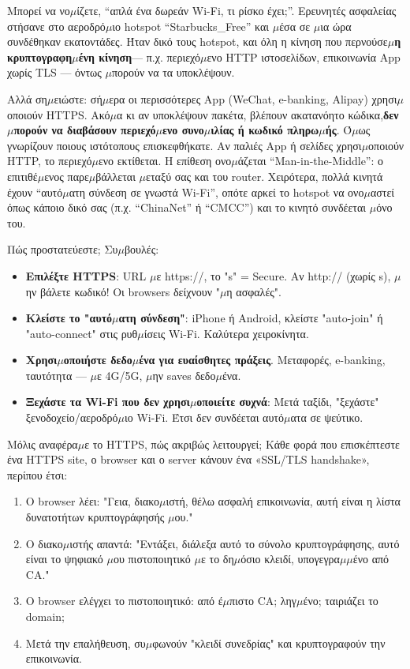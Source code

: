 Μπορεί να νο$\mu$ίζετε, “απλά ένα δωρεάν Wi-Fi, τι ρίσκο έχει;”. Ερευνητές ασφαλείας στήσανε στο αεροδρό$\mu$ιο hotspot “Starbucks\_Free” και $\mu$έσα σε $\mu$ια ώρα συνδέθηκαν εκατοντάδες. Ήταν δικό τους hotspot, και όλη η κίνηση που περνούσε\textbf{$\mu$η κρυπτογραφη$\mu$ένη κίνηση}— π.χ. περιεχό$\mu$ενο HTTP ιστοσελίδων, επικοινωνία App χωρίς TLS — όντως $\mu$πορούν να τα υποκλέψουν.

Αλλά ση$\mu$ειώστε: σή$\mu$ερα οι περισσότερες App (WeChat, e-banking, Alipay) χρησι$\mu$οποιούν HTTPS. Ακό$\mu$α κι αν υποκλέψουν πακέτα, βλέπουν ακατανόητο κώδικα,\textbf{δεν $\mu$πορούν να διαβάσουν περιεχό$\mu$ενο συνο$\mu$ιλίας ή κωδικό πληρω$\mu$ής}. Ό$\mu$ως γνωρίζουν ποιους ιστότοπους επισκεφθήκατε. Αν παλιές App ή σελίδες χρησι$\mu$οποιούν HTTP, το περιεχό$\mu$ενο εκτίθεται. Η επίθεση ονο$\mu$άζεται “Man-in-the-Middle”: ο επιτιθέ$\mu$ενος παρε$\mu$βάλλεται $\mu$εταξύ σας και του router. Χειρότερα, πολλά κινητά έχουν “αυτό$\mu$ατη σύνδεση σε γνωστά Wi-Fi”, οπότε αρκεί το hotspot να ονο$\mu$αστεί όπως κάποιο δικό σας (π.χ. “ChinaNet” ή “CMCC”) και το κινητό συνδέεται $\mu$όνο του.

Πώς προστατεύεστε; Συ$\mu$βουλές:

\begin{itemize}
  \item \textbf{Επιλέξτε HTTPS}: URL $\mu$ε https://, το "s" = Secure. Αν http:// (χωρίς s), $\mu$ην βάλετε κωδικό! Οι browsers δείχνουν "$\mu$η ασφαλές".
  \item \textbf{Κλείστε το "αυτό$\mu$ατη σύνδεση"}: iPhone ή Android, κλείστε "auto-join" ή "auto-connect" στις ρυθ$\mu$ίσεις Wi-Fi. Καλύτερα χειροκίνητα.
  \item \textbf{Χρησι$\mu$οποιήστε δεδο$\mu$ένα για ευαίσθητες πράξεις}. Μεταφορές, e-banking, ταυτότητα — $\mu$ε 4G/5G, $\mu$ην saves δεδο$\mu$ένα.
  \item \textbf{Ξεχάστε τα Wi-Fi που δεν χρησι$\mu$οποιείτε συχνά}: Μετά ταξίδι, "ξεχάστε" ξενοδοχείο/αεροδρό$\mu$ιο Wi-Fi. Έτσι δεν συνδέεται αυτό$\mu$ατα σε ψεύτικο.
\end{itemize}


Μόλις αναφέρα$\mu$ε το HTTPS, πώς ακριβώς λειτουργεί; Κάθε φορά που επισκέπτεστε ένα HTTPS site, ο browser και ο server κάνουν ένα «SSL/TLS handshake», περίπου έτσι:

\begin{enumerate}
  \item Ο browser λέει: "Γεια, διακο$\mu$ιστή, θέλω ασφαλή επικοινωνία, αυτή είναι η λίστα δυνατοτήτων κρυπτογράφησής $\mu$ου."
  \item Ο διακο$\mu$ιστής απαντά: "Εντάξει, διάλεξα αυτό το σύνολο κρυπτογράφησης, αυτό είναι το ψηφιακό $\mu$ου πιστοποιητικό $\mu$ε το δη$\mu$όσιο κλειδί, υπογεγρα$\mu$$\mu$ένο από CA."
  \item Ο browser ελέγχει το πιστοποιητικό: από έ$\mu$πιστο CA; ληγ$\mu$ένο; ταιριάζει το domain;
  \item Μετά την επαλήθευση, συ$\mu$φωνούν "κλειδί συνεδρίας" και κρυπτογραφούν την επικοινωνία.
\end{enumerate}

